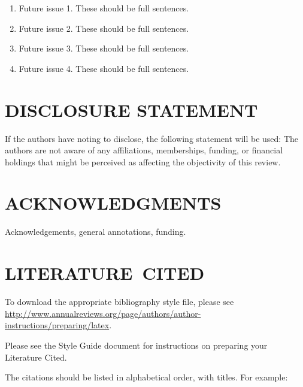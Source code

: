 \documentclass[letterpaper]{ar-1col}
\begin{document}
\begin{issues}
\begin{enumerate}
\item Future issue 1. These should be full sentences.
\item Future issue 2. These should be full sentences.
\item Future issue 3. These should be full sentences.
\item Future issue 4. These should be full sentences.
\end{enumerate}
\end{issues}

\section*{DISCLOSURE STATEMENT}
If the authors have noting to disclose, the following statement will be used: The authors are not aware of any affiliations, memberships, funding, or financial holdings that
might be perceived as affecting the objectivity of this review. 

\section*{ACKNOWLEDGMENTS}
Acknowledgements, general annotations, funding.

%
\section*{LITERATURE\ CITED}

To download the appropriate bibliography style file, please see \url{http://www.annualreviews.org/page/authors/author-instructions/preparing/latex}. 


\noindent
Please see the Style Guide document for instructions on preparing your Literature Cited.

The citations should be listed in alphabetical order, with titles. For example:
\end{document}
